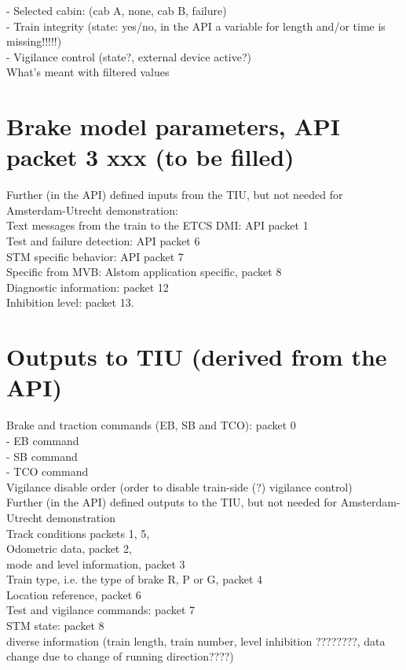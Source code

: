 \documentclass{template/openetcs_report}
\begin{document}
- Selected cabin: (cab A, none, cab B, failure)\\

- Train integrity (state:  yes/no, in the API a variable for length and/or time is missing!!!!!)\\

- Vigilance control (state?, external device active?)\\

What's meant with filtered values\\

\section{Brake model parameters, API packet 3
xxx (to be filled)}


Further (in the API) defined inputs from the TIU, but not needed for Amsterdam-Utrecht demonstration:\\
Text messages from the train to the ETCS DMI: API packet 1\\
Test and failure detection: API packet 6\\
STM specific behavior: API packet 7\\
Specific from MVB: Alstom application specific, packet 8\\
Diagnostic information: packet 12\\
Inhibition level: packet 13.\\

\section{Outputs to TIU (derived from the API)}
Brake and traction commands (EB, SB and TCO): packet 0\\
- EB command\\
- SB command\\
- TCO command\\ 
Vigilance disable order (order to disable train-side (?) vigilance control)\\


Further (in the API) defined outputs to the TIU, but not needed for Amsterdam-Utrecht demonstration\\
Track conditions packets 1, 5,\\
Odometric data, packet 2,\\
mode and level information, packet 3\\
Train type, i.e. the type of brake R, P or G, packet 4\\
Location reference, packet 6\\
Test and vigilance commands: packet 7\\
STM state: packet 8\\
diverse information (train length, train number,  level inhibition ????????, data change due to change of running direction????)\\
\end{document}
